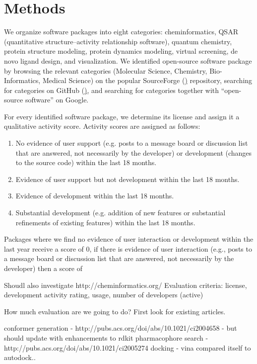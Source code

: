 \section{Methods}

We organize software packages into eight categories: cheminformatics, QSAR (quantitative structure–activity relationship software), quantum chemistry, protein structure modeling, protein dynamics modeling, virtual screening, de novo ligand design, and visualization.
We identified open-source software package by browsing the relevant categories (Molecular Science, Chemistry, Bio-Informatics, Medical Science) on the popular SourceForge (\href{http://sourceforge.net}) repository, searching for categories on GitHub (\href{http://github.com}), and searching for categories together with ``open-source software'' on Google.

For every identified software package, we determine its license and assign it a qualitative activity score. Activity scores are assigned as follows: 
\begin{enumerate}
  \setcounter{enumi}{0}
  \item No evidence of user support (e.g. posts to a message board or discussion list that are answered, not necessarily by the developer) or development (changes to the source code) within the last 18 months.
  \item Evidence of user support but not development within the last 18 months.
  \item Evidence of development within the last 18 months.
  \item Substantial development (e.g. addition of new features or substantial refinements of existing features) within the last 18 months.
\end{enumerate}

Packages where we find no evidence of user interaction or development within the last year receive a score of 0, if there is evidence of user interaction (e.g., posts to a message board or discussion list that are answered, not necessarily by the developer) then a score of 

Shoudl also investigate http://cheminformatics.org/
Evaluation criteria: license, development activity rating, usage, number of developers (active)


 
 
 How much evaluation are we going to do?  First look for existing articles.
 
 conformer generation - http://pubs.acs.org/doi/abs/10.1021/ci2004658 - but should update with enhancements to rdkit
 pharmacophore search - http://pubs.acs.org/doi/abs/10.1021/ci2005274
 docking - vina compared itself to autodock..
  
  